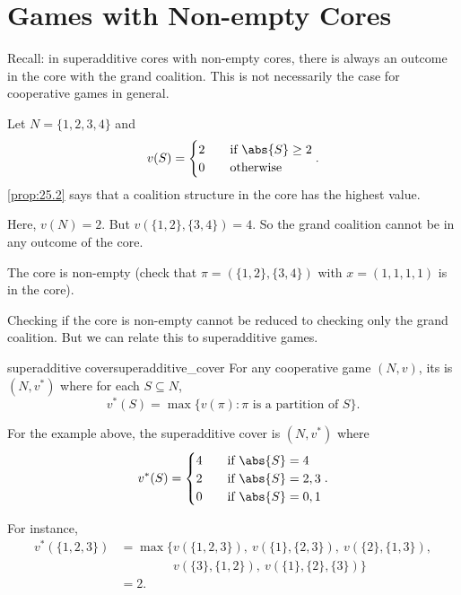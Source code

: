 \documentclass[12pt,letterpaper]{report}
\begin{document}
\section{Games with Non-empty Cores}

Recall: in superadditive cores with non-empty cores, there is always an outcome in the core with the
grand coalition.
This is not necessarily the case for cooperative games in general.

\begin{ex}
  Let $N = \{1, 2, 3, 4\}$ and
  \[
    v(S) = \begin{cases}
      2 \quad & \text{if } \abs{S} \geq 2 \\
      0 & \text{otherwise}
    \end{cases}.
  \]
  \cref{prop:25.2} says that a coalition structure in the core has the highest value.

  Here, $v(N) = 2$.
  But $v(\{1, 2\}, \{3, 4\}) = 4$.
  So the grand coalition cannot be in any outcome of the core.

  The core is non-empty (check that $\pi = (\{1, 2\}, \{3, 4\})$ with $x = (1, 1, 1, 1)$ is in the
  core).
\end{ex}

Checking if the core is non-empty cannot be reduced to checking only the grand coalition.
But we can relate this to superadditive games.

\begin{defn}{superadditive cover}{superadditive_cover}
  For any cooperative game $(N, v)$, its  is $(N, v^*)$ where for each
  $S \subseteq N$,
  \[
    v^*(S) = \max\{ v(\pi) : \pi \text{ is a partition of } S \}.
  \]
\end{defn}

\begin{ex}
  For the example above, the superadditive cover is $(N, v^*)$ where
  \[
    v^*(S) = \begin{cases}
      4 \quad & \text{if } \abs{S} = 4 \\
      2 & \text{if } \abs{S} = 2, 3 \\
      0 & \text{if } \abs{S} = 0, 1
    \end{cases}.
  \]

  For instance,
  \begin{align*}
    v^*(\{1, 2, 3\})
    &= \max\{ v(\{1, 2, 3\}), \ v(\{1\}, \{2, 3\}), \ v(\{2\}, \{1, 3\}), \\
    &\phantom{{}={} \max\{} v(\{3\}, \{1, 2\}), \ v(\{1\}, \{2\}, \{3\}) \} \\
    &= 2.
  \end{align*}
\end{ex}
\end{document}
